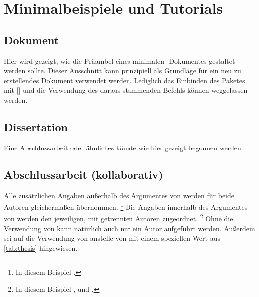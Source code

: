 \chapter{Minimalbeispiele und Tutorials}
\label{sec:exmpl}
%

\section{Dokument}
%
Hier wird gezeigt, wie die Präambel eines minimalen -Dokumentes 
gestaltet werden sollte. Dieser Ausschnitt kann prinzipiell als Grundlage für 
ein neu zu erstellendes Dokument verwendet werden. Lediglich das Einbinden des 
Paketes  mit [] und 
die Verwendung des daraus stammenden Befehls  können 
weggelassen werden.

\section{Dissertation}
\label{sec:exmpl:dissertation}
%
Eine Abschlussarbeit oder ähnliches könnte wie hier gezeigt begonnen werden.

\section{Abschlussarbeit (kollaborativ)}
\label{sec:exmpl:thesis}
%
%
Alle zusätzlichen Angaben außerhalb des Argumentes von  werden 
für beide Autoren gleichermaßen übernommen.%
\footnote{In diesem Beispiel .}
Die Angaben innerhalb des Argumentes von  werden den jeweiligen, 
mit  getrennten Autoren zugeordnet.%
\footnote{%
  In diesem Beispiel ,  und 
  .
}
Ohne die Verwendung von  kann natürlich auch nur ein Autor 
aufgeführt werden. Außerdem sei auf die Verwendung von  anstelle 
von  mit einem speziellen Wert aus \autoref{tab:thesis} 
hingewiesen.

